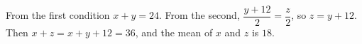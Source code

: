 From the first condition $x+y=24$. From the second, $\dfrac{y+12}{2}=\dfrac {z}{2}$, so $z=y+12$. Then $x+z=x+y+12=36$, and the mean of $x$ and $z$ is $\boxed{18}$.

